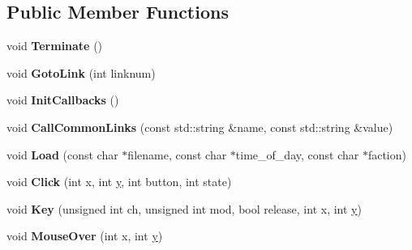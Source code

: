 \subsection*{Public Member Functions}
\begin{DoxyCompactItemize}
\item 
void {\bfseries Terminate} ()\hypertarget{classBaseInterface_a1e32e79a22d1848c5f4d8ded8d3411e9}{}\label{classBaseInterface_a1e32e79a22d1848c5f4d8ded8d3411e9}

\item 
void {\bfseries Goto\+Link} (int linknum)\hypertarget{classBaseInterface_ae51f0c4f5e629130c7b77d3ab5109bbd}{}\label{classBaseInterface_ae51f0c4f5e629130c7b77d3ab5109bbd}

\item 
void {\bfseries Init\+Callbacks} ()\hypertarget{classBaseInterface_afad634fbfb146eb1f2f717e1537655b0}{}\label{classBaseInterface_afad634fbfb146eb1f2f717e1537655b0}

\item 
void {\bfseries Call\+Common\+Links} (const std\+::string \&name, const std\+::string \&value)\hypertarget{classBaseInterface_a6218db7d82b68c8502873cdcdb1079cf}{}\label{classBaseInterface_a6218db7d82b68c8502873cdcdb1079cf}

\item 
void {\bfseries Load} (const char $\ast$filename, const char $\ast$time\+\_\+of\+\_\+day, const char $\ast$faction)\hypertarget{classBaseInterface_a5064c3dd44f4276d97fef696c1f0ee6f}{}\label{classBaseInterface_a5064c3dd44f4276d97fef696c1f0ee6f}

\item 
void {\bfseries Click} (int x, int \hyperlink{IceUtils_8h_aa7ffaed69623192258fb8679569ff9ba}{y}, int button, int state)\hypertarget{classBaseInterface_a8694438607fd36b1a0a1161aa3aa55e9}{}\label{classBaseInterface_a8694438607fd36b1a0a1161aa3aa55e9}

\item 
void {\bfseries Key} (unsigned int ch, unsigned int mod, bool release, int x, int \hyperlink{IceUtils_8h_aa7ffaed69623192258fb8679569ff9ba}{y})\hypertarget{classBaseInterface_a575d78acd3eb80b9c92f0c2eda6b88a0}{}\label{classBaseInterface_a575d78acd3eb80b9c92f0c2eda6b88a0}

\item 
void {\bfseries Mouse\+Over} (int x, int \hyperlink{IceUtils_8h_aa7ffaed69623192258fb8679569ff9ba}{y})\hypertarget{classBaseInterface_a03e878227252b7d3059e7edee24b78a4}{}\label{classBaseInterface_a03e878227252b7d3059e7edee24b78a4}


\end{DoxyCompactItemize}
